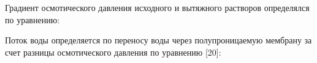 Градиент осмотического давления исходного и вытяжного растворов
определялся по уравнению:


Поток воды определяется по переносу воды через полупроницаемую мембрану
за счет разницы осмотического давления по уравнению {[}20{]}:



